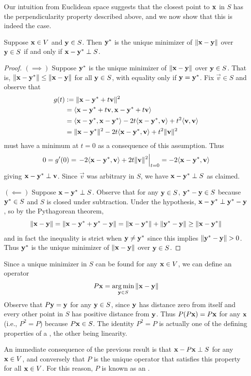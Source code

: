 Our intuition from Euclidean space suggests that the closest point to $\mathbf{x}$ in $S$ has the perpendicularity property described above, and we now show that this is indeed the case.
\begin{proposition}
Suppose $\mathbf{x} \in V$ and $\mathbf{y} \in S$.
Then $\mathbf{y}^*$ is the unique minimizer of $\|\mathbf{x}-\mathbf{y}\|$ over $\mathbf{y} \in S$ if and only if $\mathbf{x}-\mathbf{y}^* \perp S$.
\end{proposition}
\begin{proof}
$(\implies)$
Suppose $\mathbf{y}^*$ is the unique minimizer of $\|\mathbf{x}-\mathbf{y}\|$ over $\mathbf{y} \in S$.
That is, $\|\mathbf{x}-\mathbf{y}^*\| \leq \|\mathbf{x}-\mathbf{y}\|$ for all $\mathbf{y} \in S$, with equality only if $\mathbf{y} = \mathbf{y}^*$.
Fix $\vec{v} \in S$ and observe that
\begin{align*}
g(t) &:= \|\mathbf{x}-\mathbf{y}^*+t\mathbf{v}\|^2 \\
&= \langle \mathbf{x}-\mathbf{y}^*+t\mathbf{v}, \mathbf{x}-\mathbf{y}^*+t\mathbf{v} \rangle \\
&= \langle \mathbf{x}-\mathbf{y}^*, \mathbf{x}-\mathbf{y}^* \rangle - 2t\langle \mathbf{x}-\mathbf{y}^*, \mathbf{v} \rangle + t^2\langle \mathbf{v}, \mathbf{v} \rangle \\
&= \|\mathbf{x}-\mathbf{y}^*\|^2 - 2t\langle \mathbf{x}-\mathbf{y}^*, \mathbf{v} \rangle + t^2\|\mathbf{v}\|^2
\end{align*}
must have a minimum at $t = 0$ as a consequence of this assumption.
Thus
\[0 = g'(0) = \left.-2\langle \mathbf{x}-\mathbf{y}^*, \mathbf{v} \rangle + 2t\|\mathbf{v}\|^2\right|_{t=0} = -2\langle \mathbf{x}-\mathbf{y}^*, \mathbf{v} \rangle\]
giving $\mathbf{x}-\mathbf{y}^* \perp \mathbf{v}$.
Since $\vec{v}$ was arbitrary in $S$, we have $\mathbf{x}-\mathbf{y}^* \perp S$ as claimed.

$(\impliedby)$
Suppose $\mathbf{x}-\mathbf{y}^* \perp S$.
Observe that for any $\mathbf{y} \in S$, $\mathbf{y}^*-\mathbf{y} \in S$ because $\mathbf{y}^* \in S$ and $S$ is closed under subtraction.
Under the hypothesis, $\mathbf{x}-\mathbf{y}^* \perp \mathbf{y}^*-\mathbf{y}$, so by the Pythagorean theorem,
\[\|\mathbf{x}-\mathbf{y}\| = \|\mathbf{x}-\mathbf{y}^*+\mathbf{y}^*-\mathbf{y}\| = \|\mathbf{x}-\mathbf{y}^*\| + \|\mathbf{y}^*-\mathbf{y}\| \geq \|\mathbf{x} - \mathbf{y}^*\|\]
and in fact the inequality is strict when $\mathbf{y} \neq \mathbf{y}^*$ since this implies $\|\mathbf{y}^*-\mathbf{y}\| > 0$.
Thus $\mathbf{y}^*$ is the unique minimizer of $\|\mathbf{x}-\mathbf{y}\|$ over $\mathbf{y} \in S$.
\end{proof}
Since a unique minimizer in $S$ can be found for any $\mathbf{x} \in V$, we can define an operator
\[P\mathbf{x} = \operatorname*{arg\,min}_{\mathbf{y} \in S} \|\mathbf{x}-\mathbf{y}\|\]
Observe that $P\mathbf{y} = \mathbf{y}$ for any $\mathbf{y} \in S$, since $\mathbf{y}$ has distance zero from itself and every other point in $S$ has positive distance from $\mathbf{y}$.
Thus $P(P\mathbf{x}) = P\mathbf{x}$ for any $\mathbf{x}$ (i.e., $P^2 = P$) because $P\mathbf{x} \in S$.
The identity $P^2 = P$ is actually one of the defining properties of a , the other being linearity.

An immediate consequence of the previous result is that $\mathbf{x} - P\mathbf{x} \perp S$ for any $\mathbf{x} \in V$, and conversely that $P$ is the unique operator that satisfies this property for all $\mathbf{x} \in V$.
For this reason, $P$ is known as an .

